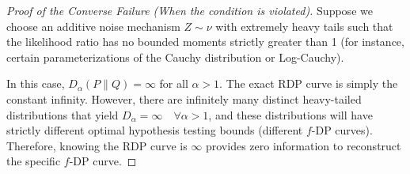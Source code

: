 \documentclass[11pt]{article}
\begin{document}
\begin{proof}[Proof of the Converse Failure (When the condition is violated)]
Suppose we choose an additive noise mechanism $Z \sim \nu$ with extremely heavy tails such that the likelihood ratio has no bounded moments strictly greater than 1 (for instance, certain parameterizations of the Cauchy distribution or Log-Cauchy). 

In this case, $D_\alpha(P\|Q) = \infty$ for all $\alpha > 1$. The exact RDP curve is simply the constant infinity. However, there are infinitely many distinct heavy-tailed distributions that yield $D_\alpha = \infty \quad \forall \alpha > 1$, and these distributions will have strictly different optimal hypothesis testing bounds (different $f$-DP curves). Therefore, knowing the RDP curve is $\infty$ provides zero information to reconstruct the specific $f$-DP curve.
\end{proof}
\end{document}
